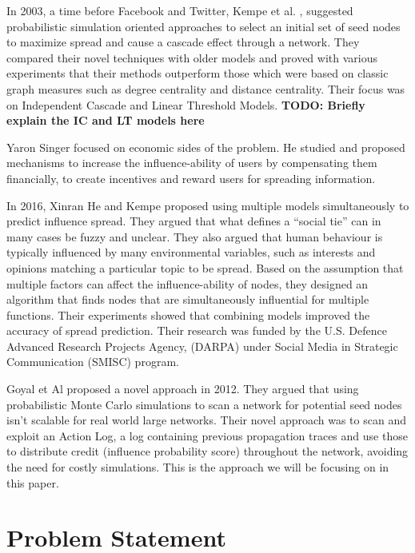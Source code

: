 \documentclass{acm_proc_article-sp}
\begin{document}
In 2003, a time before Facebook and Twitter, Kempe et al. \cite{kempe:maxspread}, suggested probabilistic simulation oriented approaches to select an initial set of seed nodes to maximize spread and cause a cascade effect through a network. They compared their novel techniques with older models and proved with various experiments that their methods outperform those which were based on classic graph measures such as degree centrality and distance centrality. Their focus was on Independent Cascade and Linear Threshold Models.
\textbf{TODO: Briefly explain the IC and LT models here}

Yaron Singer \cite{singer:winfriends} focused on economic sides of the problem. He studied and proposed mechanisms to increase the influence-ability of users by compensating them financially, to create incentives and reward users for spreading information.

In 2016, Xinran He and Kempe \cite{DBLP:journals/corr/HeK16} proposed using multiple models simultaneously to predict influence spread. They argued that what defines a “social tie” can in many cases be fuzzy and unclear. They also argued that human behaviour is typically influenced by many environmental variables, such as interests and opinions matching a particular topic to be spread. Based on the assumption that multiple factors can affect the influence-ability of nodes, they designed an algorithm that finds nodes that are simultaneously influential for multiple functions. Their experiments showed that combining models improved the accuracy of spread prediction. Their research was funded by the U.S. Defence Advanced Research Projects Agency, (DARPA) under Social Media in Strategic Communication (SMISC) program.


Goyal et Al \cite{goyal:datainfluence} proposed a novel approach in 2012. They argued that using probabilistic Monte Carlo simulations to scan a network for potential seed nodes isn't scalable for real world large networks. Their novel approach was to scan and exploit an Action Log, a log containing previous propagation traces and use those to distribute credit (influence probability score) throughout the network, avoiding the need for costly simulations. This is the approach we will be focusing on in this paper.


\section{Problem Statement}
\end{document}
